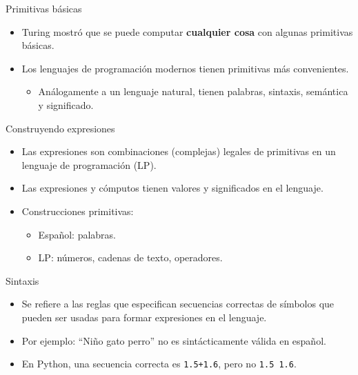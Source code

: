 \documentclass[mathserif]{beamer}
\begin{document}
\begin{frame}{Primitivas básicas}
    \begin{itemize}
        \item Turing mostró que se puede computar {\bfseries\blue cualquier cosa} con algunas primitivas básicas.
        \item Los lenguajes de programación modernos tienen primitivas más convenientes.
            \begin{itemize}
                \item Análogamente a un lenguaje natural, tienen palabras, sintaxis, semántica y significado.
            \end{itemize}
            
    \end{itemize}
\end{frame}

\begin{frame}{Construyendo expresiones}
    \begin{itemize}
        \item Las {\blue expresiones} son combinaciones (complejas) legales de primitivas en un lenguaje de programación (LP). 
        \item Las expresiones y cómputos tienen valores y significados en el lenguaje. 
        \item Construcciones primitivas: 
            \begin{itemize}
                \item Español: palabras.
                \item LP: números, cadenas de texto, operadores.
            \end{itemize}
    \end{itemize}
\end{frame}

\begin{frame}{Sintaxis}
    \begin{itemize}
        \item Se refiere a las reglas que especifican {\blue secuencias correctas} de símbolos que pueden ser usadas para formar expresiones en el lenguaje.
        
        \item Por ejemplo: ``Niño gato perro'' no es sintácticamente válida en español.
        \item En Python, una secuencia correcta es \lstinline|1.5+1.6|, pero no \lstinline|1.5 1.6|.
    \end{itemize}
\end{frame}
\end{document}
